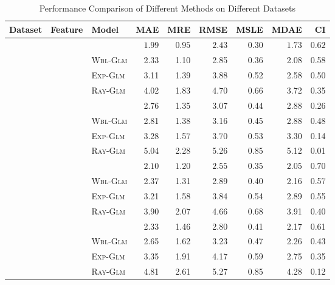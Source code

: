 \begin{table}[t]
	\centering
	\caption{Performance Comparison of Different Methods on Different Datasets}
	\label{table:results}
	\footnotesize
	\begin{tabu} to \columnwidth {c c l r r r r r r}
		\toprule
		Dataset & Feature &
		Model &  MAE &   MRE &   RMSE &   MSLE &   MDAE &  CI \\
		\midrule
		& 
		& \npglm  &  $\bm{1.99}$ &  $\bm{0.95}$ &   $\bm{2.43}$ &   $\bm{0.30}$ &  $\bm{1.73}$ & $\bm{0.62}$ \\
		& & \textsc{Wbl-Glm} &  2.33 &  1.10 &   2.85 &   0.36 &   2.08 & 0.58 \\
		& & \textsc{Exp-Glm} &  3.11 &  1.39 &   3.88 &   0.52 &   2.58 & 0.50 \\
		& & \textsc{Ray-Glm} &  4.02 &  1.83 &   4.70 &   0.66 &   3.72 & 0.35 \\
		
		&                                                   
		& \npglm               &  2.76 &  1.35 &   3.07 &   0.44 &   2.88 & 0.26 \\
		& & \textsc{Wbl-Glm}     &  2.81 &  1.38 &   3.16 &   0.45 &   2.88 & 0.48 \\
		& & \textsc{Exp-Glm}     &  3.28 &  1.57 &   3.70 &   0.53 &   3.30 & 0.14 \\
		& & \textsc{Ray-Glm}     &  5.04 &  2.28 &   5.26 &   0.85 &   5.12 & 0.01 \\
		
		\midrule
		& 
		& \npglm  &  $\bm{2.10}$ &  $\bm{1.20}$ &   $\bm{2.55}$ &   $\bm{0.35}$ &   $\bm{2.05}$ & $\bm{0.70}$ \\
		& & \textsc{Wbl-Glm} &  2.37 &  1.31 &   2.89 &   0.40 &   2.16 & 0.57 \\
		& & \textsc{Exp-Glm} &  3.21 &  1.58 &   3.84 &   0.54 &   2.89 & 0.55 \\
		& & \textsc{Ray-Glm} &  3.90 &  2.07 &   4.66 &   0.68 &   3.91 & 0.40 \\
		
		&                                                   
		& \npglm               &  2.33 &  1.46 &   2.80 &   0.41 &   2.17 & 0.61 \\
		& & \textsc{Wbl-Glm}     &  2.65 &  1.62 &   3.23 &   0.47 &   2.26 & 0.43 \\
		& & \textsc{Exp-Glm}     &  3.35 &  1.91 &   4.17 &   0.59 &   2.75 & 0.35 \\
		& & \textsc{Ray-Glm}     &  4.81 &  2.61 &   5.27 &   0.85 &   4.28 & 0.12 \\
		

\end{tabu}
\end{table}
